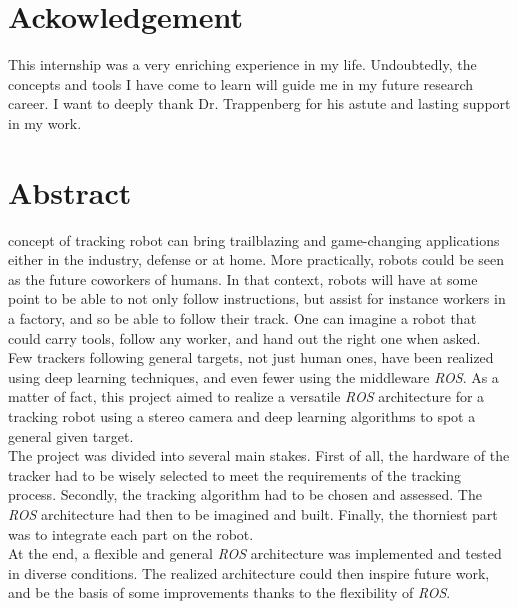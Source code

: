 
\vspace{50pt}

\section*{Ackowledgement}\label{thk}

This internship was a very enriching experience in my life.
Undoubtedly, the concepts and tools I have come to learn will 
guide me in my future research career. I want to deeply thank
Dr. Trappenberg for his astute and lasting support
in my work.


\clearpage

\section*{Abstract}

 concept of tracking robot can bring trailblazing and 
game-changing applications either in the industry, defense or
at home. More practically, robots could be seen as
the future coworkers of humans. In that context, 
robots will have at some point to be able to 
not only follow instructions, but assist for instance
workers in a factory, and so be able to 
follow their track. One can imagine a robot that could 
carry tools, follow any worker, and hand out the right one 
when asked.
\\\indent Few trackers following general targets, not just 
human ones, have been realized using deep learning
techniques, and even fewer using the middleware
\textit{ROS}. As a matter of fact, this project aimed to 
realize a versatile \textit{ROS} architecture
for a tracking robot using a stereo camera
and deep learning algorithms to spot a 
general given target.
\\\indent The project was divided into 
several main stakes. First of all, the hardware
of the tracker had to be wisely selected to 
meet the requirements of the tracking process. 
Secondly, the tracking algorithm had to be chosen 
and assessed. The \textit{ROS} architecture had 
then to be imagined and built. Finally, the thorniest 
part was to integrate each part on the robot.
\\\indent At the end, a flexible and general \textit{ROS}
architecture was implemented and tested in diverse 
conditions. The realized architecture 
could then inspire future work, and be the basis 
of some improvements thanks to the flexibility of \textit{ROS}.


\clearpage
